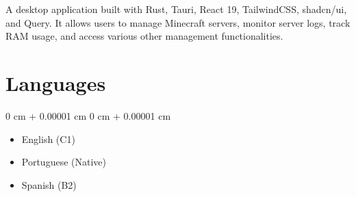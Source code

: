 \documentclass[10pt, letterpaper]{article}
\newenvironment{highlights}{ \begin{itemize}[ topsep=0.10 cm, parsep=0.10 cm, partopsep=0pt,
itemsep=0pt, leftmargin=0 cm + 10pt ] }{ \end{itemize} } %
\newenvironment{onecolentry}{ \begin{adjustwidth}{ 0 cm + 0.00001 cm }{ 0 cm + 0.00001 cm }
}{ \end{adjustwidth} } %
\begin{document}
	\vspace{0.10cm}
	A desktop application built with Rust, Tauri, React 19, TailwindCSS, shadcn/ui,
	and Query. It allows users to manage Minecraft servers, monitor server logs,
	track RAM usage, and access various other management functionalities.

	\section{Languages}

	\begin{onecolentry}
		\begin{highlights}
			\item English (C1)
			\item Portuguese (Native)
			\item Spanish (B2)
		\end{highlights}
	\end{onecolentry}
\end{document}
